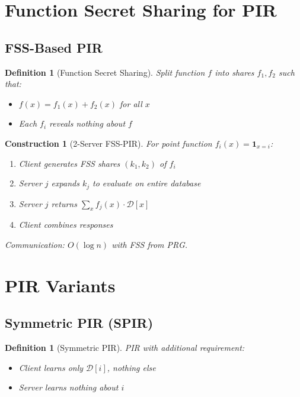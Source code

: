 \documentclass[11pt,final]{article}
\newcommand{\DB}{\mathcal{D}}
\newtheorem{definition}[theorem]{Definition}
\newtheorem{construction}[theorem]{Construction}
\begin{document}
\section{Function Secret Sharing for PIR}

\subsection{FSS-Based PIR}

\begin{definition}[Function Secret Sharing]
Split function $f$ into shares $f_1, f_2$ such that:
\begin{itemize}
    \item $f(x) = f_1(x) + f_2(x)$ for all $x$
    \item Each $f_i$ reveals nothing about $f$
\end{itemize}
\end{definition}

\begin{construction}[2-Server FSS-PIR]
For point function $f_i(x) = \mathbf{1}_{x = i}$:
\begin{enumerate}
    \item Client generates FSS shares $(k_1, k_2)$ of $f_i$
    \item Server $j$ expands $k_j$ to evaluate on entire database
    \item Server $j$ returns $\sum_x f_j(x) \cdot \DB[x]$
    \item Client combines responses
\end{enumerate}
Communication: $O(\log n)$ with FSS from PRG.
\end{construction}

\section{PIR Variants}

\subsection{Symmetric PIR (SPIR)}

\begin{definition}[Symmetric PIR]
PIR with additional requirement:
\begin{itemize}
    \item Client learns only $\DB[i]$, nothing else
    \item Server learns nothing about $i$
\end{itemize}
\end{definition}
\end{document}
